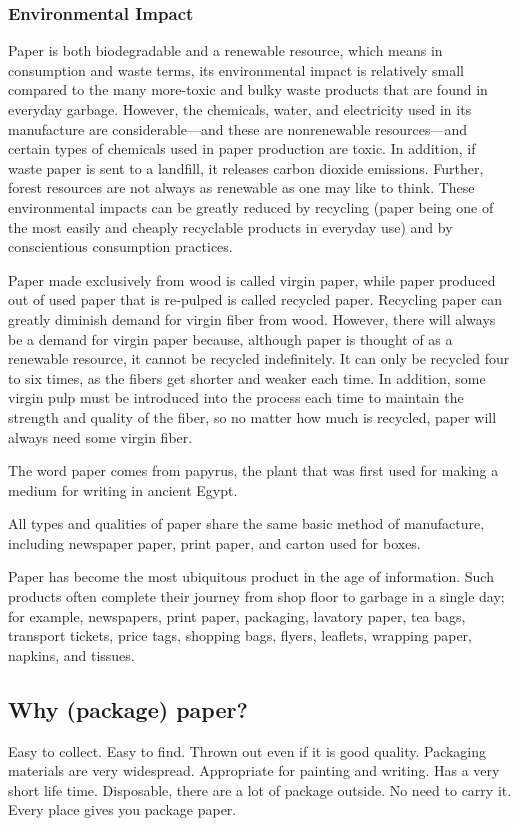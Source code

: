 %
\subsubsection{Environmental Impact}
Paper is both biodegradable and a renewable resource, which means in consumption and waste terms, its environmental impact is relatively small compared to the many more-toxic and bulky waste products that are found in everyday garbage. However, the chemicals, water, and electricity used in its manufacture are considerable---and these are nonrenewable resources---and certain types of chemicals used in paper production are toxic. In addition, if waste paper is sent to a landfill, it releases carbon dioxide emissions. Further, forest resources are not always as renewable as one may like to think. These environmental impacts can be greatly reduced by recycling (paper being one of the most easily and cheaply recyclable products in everyday use) and by conscientious consumption practices.

Paper made exclusively from wood is called virgin paper, while paper produced out of used paper that is re-pulped is called recycled paper. Recycling paper can greatly diminish demand for virgin fiber from wood. However, there will always be a demand for virgin paper because, although paper is thought of as a renewable resource, it cannot be recycled indefinitely. It can only be recycled four to six times, as the fibers get shorter and weaker each time. In addition, some virgin pulp must be introduced into the process each time to maintain the strength and quality of the fiber, so no matter how much is recycled, paper will always need some virgin fiber.

The word paper comes from papyrus, the plant that was first used for making a medium for writing in ancient Egypt.

All types and qualities of paper share the same basic method of manufacture, including newspaper paper, print paper, and carton used for boxes.

Paper has become the most ubiquitous product in the age of information. Such products often complete their journey from shop floor to garbage in a single day; for example, newspapers, print paper, packaging, lavatory paper, tea bags, transport tickets, price tags, shopping bags, flyers, leaflets, wrapping paper, napkins, and tissues. 

\subsection{Why (package) paper?}
Easy to collect. Easy to find. Thrown out even if it is good quality. Packaging materials are very widespread. Appropriate for painting and writing. Has a very short life time. Disposable, there are a lot of package outside. No need to carry it. Every place gives you package paper. 

